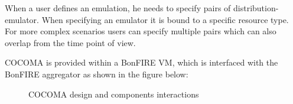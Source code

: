\documentclass[letterpaper,10pt,english]{sphinxhowto}
\begin{document}
When a user defines an emulation, he needs to specify pairs of distribution-emulator. When specifying an emulator it is bound to a specific resource type. For more complex scenarios users can specify multiple pairs which can also overlap from the time point of view.

COCOMA is provided within a BonFIRE VM, which is interfaced with the BonFIRE aggregator as shown in the figure below:
\begin{figure}[htbp]
\centering
\capstart

\caption{COCOMA design and components interactions}\label{COCOMA/10_implementation_details:cocoma-design}\end{figure}
\end{document}
